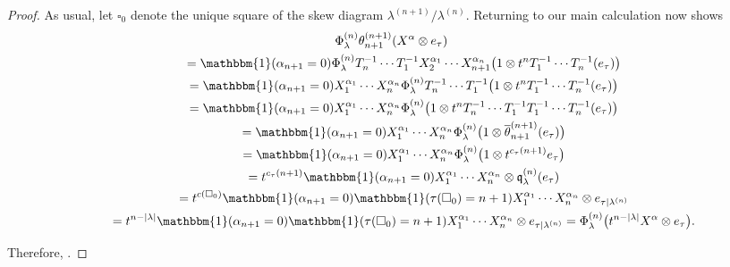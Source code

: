 \documentclass[10pt,a4paper]{amsart}
\begin{document}
\begin{proof}
As usual, let $\square_0$ denote the unique square of the skew diagram $\lambda^{(n+1)}/\lambda^{(n)}$. Returning to our main calculation now shows
\begin{gather*}
 \Phi^{(n)}_{\lambda} \theta_{n+1}^{(n+1)}(X^{\alpha} \otimes e_{\tau}) \\
 \qquad =\mathbbm{1}(\alpha_{n+1} =0)\Phi^{(n)}_{\lambda}T_n^{-1}\cdots T_1^{-1}X_2^{\alpha_1}\cdots X_{n+1}^{\alpha_n} \bigl(1\otimes t^nT_1^{-1}\cdots T_n^{-1}(e_{\tau})\bigr) \\
 \qquad = \mathbbm{1}(\alpha_{n+1} =0)X_1^{\alpha_1}\cdots X_{n}^{\alpha_{n}}\Phi^{(n)}_{\lambda}T_n^{-1}\cdots T_1^{-1} \bigl(1\otimes t^nT_1^{-1}\cdots T_n^{-1}(e_{\tau})\bigr) \\
 \qquad = \mathbbm{1}(\alpha_{n+1} =0)X_1^{\alpha_1}\cdots X_{n}^{\alpha_{n}}\Phi^{(n)}_{\lambda}\bigl(1 \otimes t^nT_n^{-1}\cdots T_1^{-1}T_1^{-1}\cdots T_n^{-1}(e_{\tau})\bigr) \\
 \qquad = \mathbbm{1}(\alpha_{n+1} =0)X_1^{\alpha_1}\cdots X_{n}^{\alpha_{n}}\Phi^{(n)}_{\lambda}\bigl(1 \otimes \overline{\theta}_{n+1}^{(n+1)}(e_{\tau})\bigr) \\
 \qquad = \mathbbm{1}(\alpha_{n+1} =0)X_1^{\alpha_1}\cdots X_{n}^{\alpha_{n}}\Phi^{(n)}_{\lambda}\bigl(1 \otimes t^{c_{\tau}(n+1)}e_{\tau}\bigr) \\
 \qquad = t^{c_{\tau}(n+1)}\mathbbm{1}(\alpha_{n+1} =0)X_1^{\alpha_1}\cdots X_{n}^{\alpha_{n}}\otimes \mathfrak{q}_{\lambda}^{(n)}(e_{\tau}) \\
 \qquad = t^{c(\square_0)}\mathbbm{1}(\alpha_{n+1} =0)\mathbbm{1}( \tau(\square_0) = n+1)X_1^{\alpha_1}\cdots X_{n}^{\alpha_{n}}\otimes e_{\tau|{\lambda^{(n)}}} \\
 \qquad = t^{n-|\lambda|} \mathbbm{1}(\alpha_{n+1} =0)\mathbbm{1}( \tau(\square_0) = n+1)X_1^{\alpha_1}\cdots X_{n}^{\alpha_{n}}\otimes e_{\tau|{\lambda^{(n)}}} = \Phi^{(n)}_{\lambda}\bigl(t^{n-|\lambda|}X^{\alpha}\otimes e_{\tau}\bigr).
\end{gather*}

Therefore,
.
\end{proof}
\end{document}
